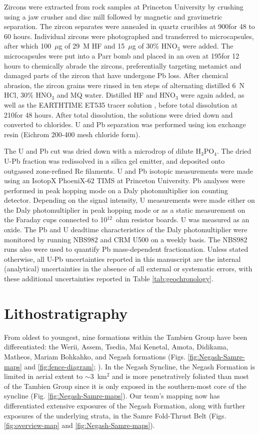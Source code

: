 Zircons were extracted from rock samples at Princeton University by crushing using a jaw crusher and disc mill followed by magnetic and gravimetric separation. The zircon separates were annealed in quartz crucibles at 900\degreesC for 48 to 60 hours. Individual zircons were photographed and transferred to microcapsules, after which 100~$\mu$g of 29~M HF and 15~$\mu$g of 30\% HNO$_{3}$ were added. The microcapsules were put into a Parr bomb and placed in an oven at 195\degreesC for 12 hours to chemically abrade the zircons, preferentially targeting metamict and damaged parts of the zircon that have undergone Pb loss. After chemical abrasion, the zircon grains were rinsed in ten steps of alternating distilled 6~N HCl, 30\% HNO$_{3}$ and MQ water. Distilled HF and HNO$_{3}$ were again added, as well as the EARTHTIME ET535 tracer solution \citep{Condon2015a, McLean2015a}, before total dissolution at 210\degreesC for 48 hours. After total dissolution, the solutions were dried down and converted to chlorides. U and Pb separation was performed using ion exchange resin (Eichrom 200-400 mesh chloride form).

The U and Pb cut was dried down with a microdrop of dilute H$_{3}$PO$_{4}$. The dried U-Pb fraction was redissolved in a silica gel emitter, and deposited onto outgassed zone-refined Re filaments. U and Pb isotopic measurements were made using an IsotopX PhoeniX-62 TIMS at Princeton University. Pb analyses were performed in peak hopping mode on a Daly photomultiplier ion counting detector. Depending on the signal intensity, U measurements were made either on the Daly photomultiplier in peak hopping mode or as a static measurement on the Faraday cups connected to 10$^{12}$~ohm resistor boards. U was measured as an oxide. The Pb and U deadtime characteristics of the Daly photomultiplier were monitored by running NBS982 and CRM U500 on a weekly basis. The NBS982 runs also were used to quantify Pb mass-dependent fractionation. Unless stated otherwise, all U-Pb uncertainties reported in this manuscript are the internal (analytical) uncertainties in the absence of all external or systematic errors, with these additional uncertainties reported in Table \ref{tab:geochronology}.

\section{Lithostratigraphy}

From oldest to youngest, nine formations within the Tambien Group have been differentiated: the Werii, Assem, Tsedia, Mai Kenetal, Amota, Didikama, Matheos, Mariam Bohkahko, and Negash formations (Figs. \ref{fig:Negash-Samre-maps} and \ref{fig:fence-diagram}; \citealp{Swanson-Hysell2015a}). In the Negash Syncline, the Negash Formation is limited in aerial extent to $\sim$3~km$^{2}$ and is more penetratively foliated than most of the Tambien Group since it is only exposed in the southern-most core of the syncline (Fig. \ref{fig:Negash-Samre-maps}). Our team's mapping now has differentiated extensive exposures of the Negash Formation, along with further exposures of the underlying strata, in the Samre Fold-Thrust Belt (Figs. \ref{fig:overview-map} and \ref{fig:Negash-Samre-maps}).

